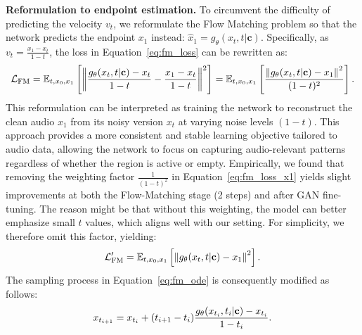 \vspace{-0.1em}
\noindent\textbf{Reformulation to endpoint estimation.} To circumvent
the difficulty of predicting the velocity $v_t$, we reformulate the Flow Matching problem so that the network predicts the endpoint $x_1$ instead: $\hat{x}_1 =g_{\theta}(x_t, t|\mathbf{c})$. 
Specifically, as $v_t = \frac{x_1 - x_t}{1 - t}$, the loss in Equation~\ref{eq:fm_loss} can be rewritten as: 
\begin{equation}
\label{eq:fm_loss_x1}
\vspace{-0.2em}
\mathcal{L}_{\mathrm{FM}}
= \mathbb{E}_{t,x_0,x_1} \left[\left\| \frac{g_{\theta}(x_t, t|\mathbf{c}) - x_t}{1 - t} - \frac{x_1 - x_t}{1 - t} \right\|^2 \right]
= \mathbb{E}_{t,x_0,x_1} \left[\frac{\left\|g_{\theta}(x_t, t|\mathbf{c}) - x_1 \right\|^2}{(1 - t)^2}\right].
\vspace{-0.1em}
\end{equation}
This reformulation can be interpreted as training the network to reconstruct the clean audio $x_1$ from its noisy version $x_t$ at varying noise levels $(1-t)$. This approach provides a more consistent and stable learning objective tailored to audio data, allowing the network to focus on capturing audio-relevant patterns regardless of whether the region is active or empty. 
Empirically, we found that removing the weighting factor $\frac{1}{(1 - t)^2}$ in Equation~\ref{eq:fm_loss_x1} yields slight improvements at both the Flow-Matching stage (2 steps) and after GAN fine-tuning. The reason might be that without this weighting, the model can better emphasize small $t$ values, which aligns well with our setting.
For simplicity, we therefore omit this factor, yielding:
\begin{equation}
\label{eq:fm_loss_x1_no_scale}
\vspace{-0.2em}
\mathcal{L}_{\mathrm{FM}}' 
= \mathbb{E}_{t,x_0,x_1} \left[\left\|g_{\theta}(x_t, t|\mathbf{c}) - x_1 \right\|^2\right].
\vspace{-0.2em}
\end{equation}
The sampling process in Equation~\ref{eq:fm_ode} is consequently modified as follows: 
\begin{equation}
\label{eq:fm_ode_x1}
\vspace{-0.3em}
x_{t_{i+1}} = x_{t_i} + (t_{i+1} - t_i)\frac{g_{\theta}(x_{t_i}, t_i|\mathbf{c}) - x_{t_i}}{1 - t_i}.
\vspace{-0.3em}
\end{equation}


